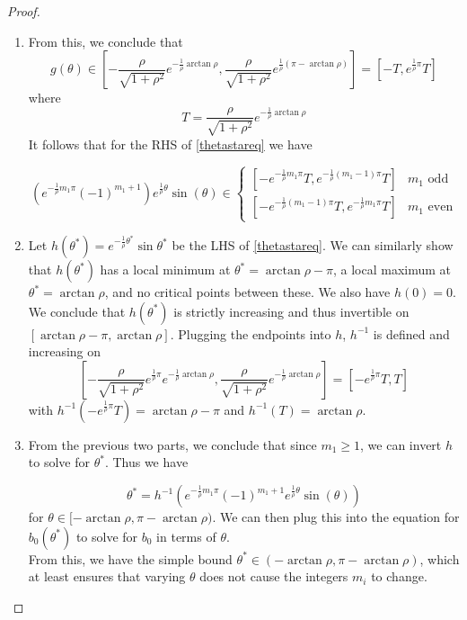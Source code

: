 \documentclass[thesis.tex]{subfiles}
\begin{document}
\begin{lemma}
\begin{proof}
\begin{enumerate}
\begin{enumerate}
		\item From this, we conclude that 
		\[
		g(\theta) \in \left[ -\frac{\rho}{\sqrt{1+\rho^2}}e^{-\frac{1}{\rho}\arctan \rho}, \frac{\rho}{\sqrt{1+\rho^2}}e^{\frac{1}{\rho}(\pi - \arctan \rho)}\right] = [-T, e^{\frac{1}{\rho}\pi} T]
		\]
		where 
		\[
		T = \frac{\rho}{\sqrt{1+\rho^2}}e^{-\frac{1}{\rho}\arctan \rho}
		\]
		It follows that for the RHS of \eqref{thetastareq} we have

		\begin{equation}\label{RHSbounds}
		\left( e^{ -\frac{1}{\rho} m_1 \pi } (-1)^{m_1 + 1} \right) e^{ \frac{1}{\rho} \theta } \sin(\theta) \in
		\begin{cases}
		[-e^{-\frac{1}{\rho}m_1 \pi} T, e^{-\frac{1}{\rho}(m_1 - 1) \pi} T] & m_1 \text{ odd}\\
		[-e^{-\frac{1}{\rho}(m_1 - 1) \pi} T, e^{-\frac{1}{\rho}m_1 \pi} T] & m_1 \text{ even}
		\end{cases}
		\end{equation}

		\item Let $h(\theta^*) = e^{ -\frac{1}{\rho}\theta^* }\sin{\theta^*}$ be the LHS of \eqref{thetastareq}. We can similarly show that $h(\theta^*)$ has a local minimum at $\theta^* = \arctan{\rho} - \pi$, a local maximum at $\theta^* = \arctan{\rho}$, and no critical points between these. We also have $h(0) = 0$. We conclude that $h(\theta^*)$ is strictly increasing and thus invertible on $[\arctan{\rho} - \pi, \arctan{\rho}]$. Plugging the endpoints into $h$, $h^{-1}$ is defined and increasing on 
		\[
		\left[ -\frac{\rho}{\sqrt{1+\rho^2}}e^{\frac{1}{\rho}\pi}e^{-\frac{1}{\rho}\arctan \rho}, \frac{\rho}{\sqrt{1+\rho^2}}e^{-\frac{1}{\rho}\arctan \rho}\right] = [-e^{\frac{1}{\rho}\pi} T , T]
		\] 
		with $h^{-1}(-e^{\frac{1}{\rho}\pi} T) = \arctan{\rho} - \pi$ and $h^{-1}(T) = \arctan \rho$. 

		\item From the previous two parts, we conclude that since $m_1 \geq 1$, we can invert $h$ to solve for $\theta^*$. Thus we have

		\[
		\theta^* = h^{-1}\left( e^{ -\frac{1}{\rho} m_1 \pi } (-1)^{m_1 + 1}  e^{ \frac{1}{\rho} \theta } \sin(\theta) \right)
		\]
		for $\theta \in [-\arctan \rho,\pi - \arctan \rho)$. We can then plug this into the equation for $b_0(\theta^*)$ to solve for $b_0$ in terms of $\theta$.\\

		From this, we have the simple bound $\theta^* \in (-\arctan \rho, \pi - \arctan \rho)$, which at least ensures that varying $\theta$ does not cause the integers $m_i$ to change.


\end{enumerate}
\end{enumerate}
\end{proof}
\end{lemma}
\end{document}
